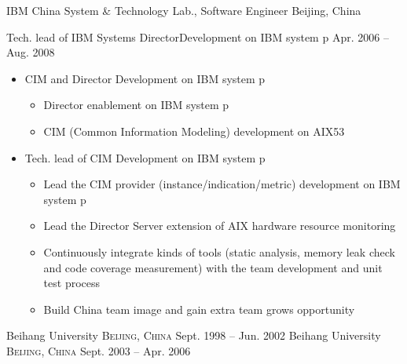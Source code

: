 \documentclass[10pt,letterpaper]{article}
\begin{document}
\headedsection 
{IBM China System \& Technology Lab., Software Engineer}
{Beijing, China} {

\headedsubsection %
{Tech. lead of IBM Systems Director\texttrademark Development on IBM system p}
{Apr. 2006 -- Aug. 2008}
{
    \begin{itemize}
        \item CIM and Director Development on IBM system p
    \begin{itemize}
\item Director enablement on IBM system p
\item CIM (Common Information Modeling) development on AIX53
    \end{itemize}
\item Tech. lead of CIM Development on IBM system p
    \begin{itemize}
        \item Lead the CIM provider (instance/indication/metric) development on
    IBM system p
\item Lead the Director Server extension of AIX hardware resource
    monitoring
\item Continuously integrate kinds of tools (static analysis, memory leak
    check and code coverage measurement) with the team development and unit
    test process
\item Build China team image and gain extra team grows opportunity
    \end{itemize}
    \end{itemize}


}
}

\spacedhrule{-0.2em}{-0.4em} %



\headedsection %
{Beihang University}
{\textsc{Beijing, China}} {
 {Sept. 1998 -- Jun. 2002} {}
}
\headedsection
{Beihang University}
{\textsc{Beijing, China}} {
    {Sept. 2003 -- Apr. 2006} {}
}
\end{document}
